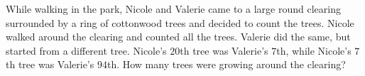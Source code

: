 While walking in the park, Nicole and Valerie came to a large round clearing surrounded by a ring of cottonwood trees and decided to count the trees. Nicole walked around the clearing and counted all the trees. Valerie did the same, but started from a different tree. Nicole's $20$th tree was Valerie's $7$th, while Nicole's $7$th tree was Valerie's $94$th. How many trees were growing around the clearing?
